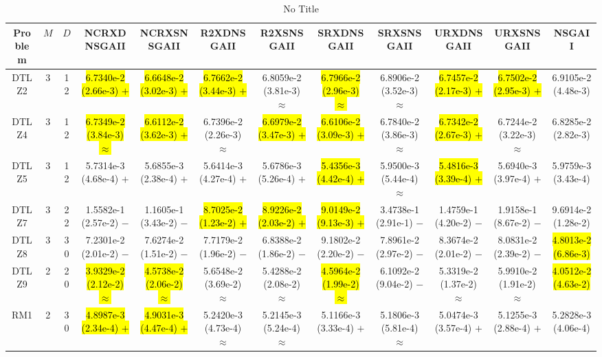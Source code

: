 \documentclass[journal]{IEEEtran}
\begin{document}
\begin{table*}[htbp]
\renewcommand{\arraystretch}{1.2}
\centering
\caption{No Title}
\begin{tabular}{cccccccccccc}
\toprule
Problem&$M$&$D$&NCRXDNSGAII&NCRXSNSGAII&R2XDNSGAII&R2XSNSGAII&SRXDNSGAII&SRXSNSGAII&URXDNSGAII&URXSNSGAII&NSGAII\\
\midrule
\multirow{1}{*}{DTLZ2}&3&12&\hl{6.7340e-2 (2.66e-3) $+$}&\hl{6.6648e-2 (3.02e-3) $+$}&\hl{6.7662e-2 (3.44e-3) $+$}&6.8059e-2 (3.81e-3) $\approx$&\hl{6.7966e-2 (2.96e-3) $\approx$}&6.8906e-2 (3.52e-3) $\approx$&\hl{6.7457e-2 (2.17e-3) $+$}&\hl{6.7502e-2 (2.95e-3) $+$}&6.9105e-2 (4.48e-3)\\
\hline
\multirow{1}{*}{DTLZ4}&3&12&\hl{6.7349e-2 (3.84e-3) $\approx$}&\hl{6.6112e-2 (3.62e-3) $+$}&6.7396e-2 (2.26e-3) $\approx$&\hl{6.6979e-2 (3.47e-3) $+$}&\hl{6.6106e-2 (3.09e-3) $+$}&6.7840e-2 (3.86e-3) $\approx$&\hl{6.7342e-2 (2.67e-3) $+$}&6.7244e-2 (3.22e-3) $\approx$&6.8285e-2 (2.82e-3)\\
\hline
\multirow{1}{*}{DTLZ5}&3&12&5.7314e-3 (4.68e-4) $+$&5.6855e-3 (2.38e-4) $+$&5.6414e-3 (4.27e-4) $+$&5.6786e-3 (5.26e-4) $+$&\hl{5.4356e-3 (4.42e-4) $+$}&5.9500e-3 (5.44e-4) $\approx$&\hl{5.4816e-3 (3.39e-4) $+$}&5.6940e-3 (3.97e-4) $+$&5.9759e-3 (3.43e-4)\\
\hline
\multirow{1}{*}{DTLZ7}&3&22&1.5582e-1 (2.57e-2) $-$&1.1605e-1 (3.43e-2) $-$&\hl{8.7025e-2 (1.23e-2) $+$}&\hl{8.9226e-2 (2.03e-2) $+$}&\hl{9.0149e-2 (9.13e-3) $+$}&3.4738e-1 (2.91e-1) $-$&1.4759e-1 (4.20e-2) $-$&1.9158e-1 (8.67e-2) $-$&9.6914e-2 (1.28e-2)\\
\hline
\multirow{1}{*}{DTLZ8}&3&30&7.2301e-2 (2.01e-2) $-$&7.6274e-2 (1.51e-2) $-$&7.7179e-2 (1.96e-2) $-$&6.8388e-2 (1.86e-2) $-$&9.1802e-2 (2.20e-2) $-$&7.8961e-2 (2.97e-2) $-$&8.3674e-2 (2.01e-2) $-$&8.0831e-2 (2.39e-2) $-$&\hl{4.8013e-2 (6.86e-3)}\\
\hline
\multirow{1}{*}{DTLZ9}&2&20&\hl{3.9329e-2 (2.12e-2) $\approx$}&\hl{4.5738e-2 (2.06e-2) $\approx$}&5.6548e-2 (3.69e-2) $\approx$&5.4288e-2 (2.08e-2) $\approx$&\hl{4.5964e-2 (1.99e-2) $\approx$}&6.1092e-2 (9.04e-2) $-$&5.3319e-2 (1.37e-2) $\approx$&5.9910e-2 (1.91e-2) $\approx$&\hl{4.0512e-2 (4.63e-2)}\\
\hline
\multirow{1}{*}{RM1}&2&30&\hl{4.8987e-3 (2.34e-4) $+$}&\hl{4.9031e-3 (4.47e-4) $+$}&5.2420e-3 (4.73e-4) $\approx$&5.2145e-3 (5.24e-4) $\approx$&5.1166e-3 (3.33e-4) $+$&5.1806e-3 (5.81e-4) $\approx$&5.0474e-3 (3.57e-4) $+$&5.1255e-3 (2.88e-4) $+$&5.2828e-3 (4.06e-4)\\

\end{tabular}
\end{table*}
\end{document}
